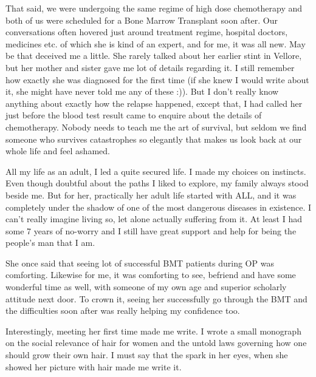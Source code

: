 {That said, we were undergoing the same regime of high dose chemotherapy and both of us were scheduled for a Bone Marrow Transplant soon after. Our conversations often hovered just around treatment regime, hospital doctors, medicines etc. of which she is kind of an expert, and for me, it was all new. May be that deceived me a little. She rarely talked about her earlier stint in Vellore, but her mother and sister gave me lot of details regarding it. I still remember how exactly she was diagnosed for the first time (if she knew I would write about it, she might have never told me any of these :)). But I don't really know anything about exactly how the relapse happened, except that, I had called her just before the blood test result came to enquire about the details of chemotherapy. Nobody needs to teach me the art of survival, but seldom we find someone who survives catastrophes so elegantly that makes us look back at our whole life and feel ashamed.

All my life as an adult, I led a quite secured life. I made my choices on instincts. Even though doubtful about the paths I liked to explore, my family always stood beside me. But for her, practically her adult life started with ALL, and it was completely under the shadow of one of the most dangerous diseases in existence. I can't really imagine living so, let alone actually suffering from it. At least I had some 7 years of no-worry and I still have great support and help for being the people's man that I am.

She once said that seeing lot of successful BMT patients during OP was comforting. Likewise for me, it was comforting to see, befriend and have some wonderful time as well, with someone of my own age and superior scholarly attitude next door. To crown it, seeing her successfully go through the BMT and the difficulties soon after was really helping my confidence too.

Interestingly, meeting her first time made me write. I wrote a small monograph on the social relevance of hair for women and the untold laws governing how one should grow their own hair. I must say  that the spark in her eyes, when she showed her picture with hair made me write it.
}
\newpage     
